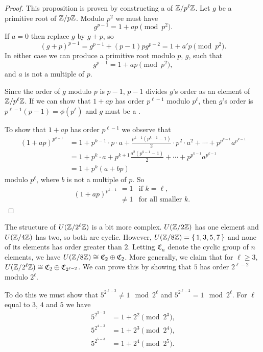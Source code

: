 \begin{proof}
This proposition is proven by constructing a  of
$\mathbb{Z}/p^{\ell}\mathbb{Z}$.  Let $g$ be a primitive root of $\mathbb{Z}/p\mathbb{Z}$.  Modulo
$p^2$ we must have 
\[
g^{p-1} = 1 + a p \pmod{p^2}.
\]
If $a = 0$ then replace $g$ by $g+p$, so
\[
(g+p)^{p-1} = g^{p-1}+ (p-1) p g^{p-2} = 1 + a' p \pmod{p^2}.
\]
In either case we can produce a primitive root modulo $p$, $g$, such
that
\[
g^{p-1} = 1 + a p \pmod{p^2},
\]
and $a$ is not a multiple of $p$.

Since the order of $g$ modulo $p$ is $p-1$, $p-1$ divides $g$'s order
as an element of $\mathbb{Z}/p^{\ell}\mathbb{Z}$.  If we can show that $1+ap$ has
order $p^{\ell-1}$ modulo $p^{\ell}$, then $g$'s order is
$p^{\ell-1}(p-1) =
\phi(p^{\ell})$ and $g$ must be a .

To show that $1+ap$ has order $p^{\ell-1}$ we observe that 
\[
\begin {aligned}
 (1+ap)^{p^{k-1}} & = 1 + p^{k-1} \cdot p \cdot a
   + \frac{p^{k-1}(p^{k-1} - 1)}{2} \cdot p^2 \cdot a^2 + \cdots 
   + p^{p^{k-1}} a^{p^{k-1}} \\
  & = 1 + p^k \cdot a + p^{k+1} \frac{a^2 (p^{k-1} - 1)}{2} 
   + \cdots + p^{p^{k-1}} a^{p^{k-1}} \\
  & = 1 + p^k(a + bp)
\end{aligned}
\]
modulo $p^{\ell}$, where $b$ is not a multiple of $p$.
So 
\[
(1+ap)^{p^{k-1}} 
 \begin{array}{rl}
  =  1 & \mbox{if $k=\ell$,} \\
  \not= 1 & \mbox{for all smaller $k$.}
 \end{array}
\]
\end{proof}

The structure of $U(\mathbb{Z}/2^{\ell}\mathbb{Z})$ is a bit more
complex.  $U(\mathbb{Z}/2\mathbb{Z})$ has one element and $U(\mathbb{Z}/4\mathbb{Z})$ has two, so both
are cyclic.  However, $U(\mathbb{Z}/8\mathbb{Z}) = \{\,1, 3, 5, 7\,\}$ and none of its
elements has order greater than $2$.  Letting $\mathfrak{C}_n$ denote the
cyclic group of $n$ elements, we have $U(\mathbb{Z}/8\mathbb{Z}) \cong \mathfrak{C}_2
\oplus \mathfrak{C}_2$.  More generally, we claim that for $\ell \ge 3$,
$U(\mathbb{Z}/2^{\ell}\mathbb{Z}) \cong \mathfrak{C}_2 \oplus \mathfrak{C}_{2^{\ell-2}}$.
We can prove this by showing that $5$ has order $2^{\ell - 2}$ modulo
$2^{\ell}$. 

To do this we must show that $5^{2^{\ell -3}} \not= 1
\mod{2^{\ell}}$ and $5^{2^{\ell -2}} = 1
\mod{2^{\ell}}$.  For $\ell$ equal to $3$, $4$ and $5$ we have
\[
\begin {aligned}
  5^{2^{3-3}} & = 1 + 2^2 \pmod{2^3}, \\
  5^{2^{4-3}} & = 1 + 2^3 \pmod{2^4}, \\
  5^{2^{5-3}} & = 1 + 2^4 \pmod{2^5}.
\end{aligned}
\]

